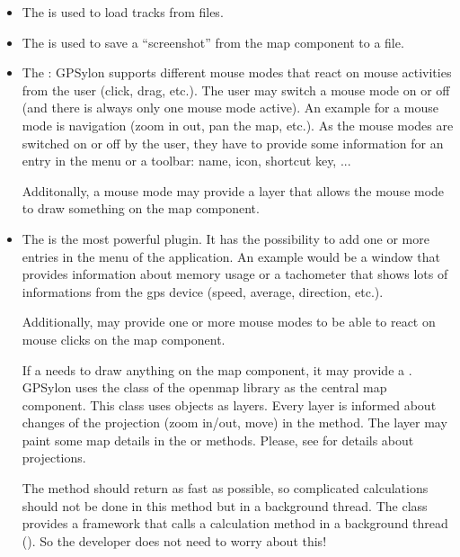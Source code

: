 \documentclass[a4paper]{article} %
\begin{document}
\begin{itemize}

\item The  is used to load tracks from
files.

\item The  is used to save a
``screenshot'' from the map component to a file.

\item The : GPSylon supports different
mouse modes that react on mouse activities from the user (click, drag,
etc.). The user may switch a mouse mode on or off (and there is always
only one mouse mode active). An example for a mouse mode is navigation
(zoom in out, pan the map, etc.). As the mouse modes are switched on
or off by the user, they have to provide some information for an entry
in the menu or a toolbar: name, icon, shortcut key, ...

Additonally, a mouse mode may provide a layer that allows the mouse
mode to draw something on the map component.
 
\item The  is the most powerful plugin. It
  has the possibility to add one or more entries in the menu of the
  application. An example would be a window that provides information
  about memory usage or a tachometer that shows lots of informations
  from the gps device (speed, average, direction, etc.).

Additionally,  may provide one or more mouse
modes to be able to react on mouse clicks on the map component. 

If a  needs to draw anything on the map
component, it may provide a .
GPSylon uses the  class of the openmap library as
the central map component. This class uses  objects
as layers.  Every layer is informed about changes of the projection
(zoom in/out, move) in the
method. The layer may paint some map details in the
 or
 methods. Please, see
 for details
about projections.

The  method should return as fast as possible, so
complicated calculations should not be done in this method but in a
background thread. The class
 provides a framework
that calls a calculation method in a background thread
(). So the developer does not need to worry
about this!


\end{itemize}
\end{document}
